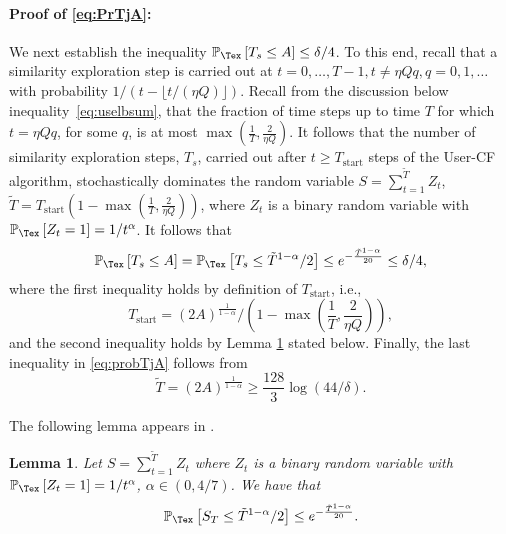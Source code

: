 \documentclass{article}
\newtheorem{lemma}{Lemma}
\renewcommand\PR[2][\Tex]{
\ifthenelse{\equal{#1}{}}{{\mathbb P}\left[#2\right]}{\ensuremath{{\mathbb P}_{#1}\left[ #2\right]}}}
\begin{document}


\paragraph{Proof of \eqref{eq:PrTjA}:}
We next establish the inequality $\PR{T_s \leq A} \leq \delta/4$. 
To this end, recall that a similarity exploration step is carried out at $t = 0,\ldots, T-1, t \neq \eta Q q, q = 0,1,\ldots$ with probability $1/ (t - \lfloor t/(\eta Q) \rfloor)$. 
Recall from the discussion below inequality~\eqref{eq:uselbsum}, 
that the fraction of time steps up to time $T$ for which $t = \eta Q q$, for some $q$, is at most $\max( \frac{1}{T} , \frac{2}{\eta Q})$. 
It follows that the number of similarity exploration steps, $T_s$, carried out after $t \geq T_{\text{start}}$ steps of the User-CF algorithm, stochastically dominates 
the random variable 
$S = \sum_{t=1}^{\tilde T} Z_t$, $\tilde T = T_{\text{start}} (1 - \max( \frac{1}{T} , \frac{2}{\eta Q}) )$,  where $Z_t$ is a binary random variable with $\PR{Z_t =1} = 1/t^\alpha$. 
It follows that 
\begin{align}
\PR{T_s \leq A} 
=
\PR{T_s \leq  \tilde T^{1-\alpha}/2  }
%
\leq 
e^{- \frac{ \tilde T^{1-\alpha} }{20}}
%
\leq
\delta/4, 
\label{eq:probTjA}
\end{align}
where the first inequality holds by definition of $T_{\text{start}}$, i.e., 
\[
T_{\text{start}}
=
(2A)^{\frac{1}{1-\alpha}} / \left(1 - \max\left( \frac{1}{T} , \frac{2}{\eta Q}\right) \right), 
\]
and the second inequality holds by Lemma \ref{lem:sumrvdec} stated below. Finally, the last inequality in \eqref{eq:probTjA} follows from 
\[
\tilde T = (2A)^{\frac{1}{1-\alpha}} \geq \frac{128}{3} \log(44/\delta). 
\]

The following lemma appears in \cite{bresler_latent_2014}. 
\begin{lemma}
Let $S = \sum_{t=1}^{\tilde T} Z_t$ where $Z_t$ is a binary random variable with $\PR{Z_t =1} = 1/t^\alpha$, $\alpha \in (0,4/7)$. 
We have that 
\[
\PR{
S_T \leq \tilde T^{1-\alpha}/2
}
\leq 
e^{- \frac{ \tilde T^{1-\alpha}}{20}}.
\]
\label{lem:sumrvdec}
\end{lemma}
\end{document}
